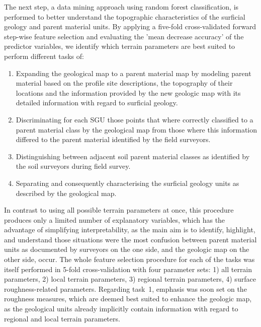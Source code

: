 \documentclass[preprint,12pt,authoryear]{elsarticle}
\begin{document}
The next step, a data mining approach using random forest classification, is performed to better understand the topographic characteristics of the surficial geology and parent material units. By applying a five-fold cross-validated forward step-wise feature selection and evaluating the 'mean decrease accuracy' of the predictor variables, we identify which terrain parameters are best suited to perform different tasks of: 
\begin{enumerate}
\item Expanding the geological map to a parent material map by modeling parent material based on the profile site descriptions, the topography of their locations and the information provided by the new geologic map with its detailed information with regard to surficial geology.
\item Discriminating for each SGU those points that where correctly classified to a parent material class by the geological map from those where this information differed to the parent material identified by the field surveyors.
\item Distinguishing between adjacent soil parent material classes as identified by the soil surveyors during field survey.
\item Separating and consequently characterising the surficial geology units as described by the geological map.
\end{enumerate}
 In contrast to using all possible terrain parameters at once, this procedure produces only a limited number of explanatory variables, which has the advantage of simplifying interpretability, as the main aim is to identify, highlight, and understand those situations were the most confusion between parent material units as documented by surveyors on the one side, and the geologic map on the other side, occur. The whole feature selection procedure for each of the tasks was itself performed in 5-fold cross-validation with four parameter sets: 1) all terrain parameters, 2) local terrain parameters, 3) regional terrain parameters, 4) surface roughness-related parameters. Regarding task~1, emphasis was soon set on the roughness measures, which are deemed best suited to enhance the geologic map, as the geological units already implicitly contain information with regard to regional and local terrain parameters. 
\end{document}
